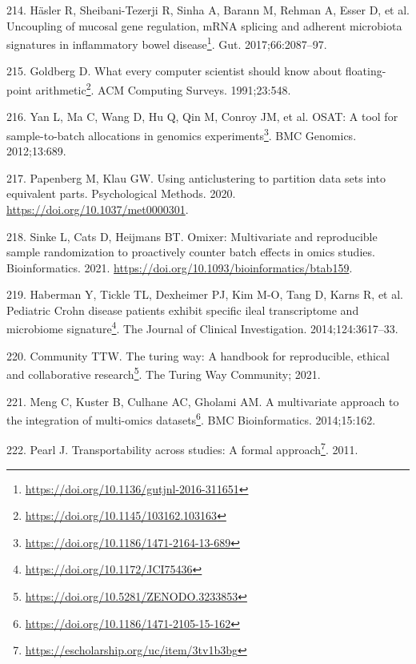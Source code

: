 \documentclass[
  12pt,
  a4paper,
  twoside,
  openright]{book}
\DeclareRobustCommand{\href}[2]{#2\footnote{\url{#1}}}
\newlength{\cslhangindent}
\newlength{\cslentryspacingunit} %
\newenvironment{CSLReferences}[2] %
 {%
  \setlength{\parindent}{0pt}
  \ifodd #1
  \let\oldpar\par
  \def\par{\hangindent=\cslhangindent\oldpar}
  \fi
  \setlength{\parskip}{#2\cslentryspacingunit}
 }%
 {}
\begin{document}
\begin{CSLReferences}{0}{0}
\leavevmode{}%
214. Häsler R, Sheibani-Tezerji R, Sinha A, Barann M, Rehman A, Esser D, et al. \href{https://doi.org/10.1136/gutjnl-2016-311651}{Uncoupling of mucosal gene regulation, mRNA splicing and adherent microbiota signatures in inflammatory bowel disease}. Gut. 2017;66:2087--97.

\leavevmode{}%
215. Goldberg D. \href{https://doi.org/10.1145/103162.103163}{What every computer scientist should know about floating-point arithmetic}. ACM Computing Surveys. 1991;23:548.

\leavevmode{}%
216. Yan L, Ma C, Wang D, Hu Q, Qin M, Conroy JM, et al. \href{https://doi.org/10.1186/1471-2164-13-689}{OSAT: A tool for sample-to-batch allocations in genomics experiments}. BMC Genomics. 2012;13:689.

\leavevmode{}%
217. Papenberg M, Klau GW. Using anticlustering to partition data sets into equivalent parts. Psychological Methods. 2020. \url{https://doi.org/10.1037/met0000301}.

\leavevmode{}%
218. Sinke L, Cats D, Heijmans BT. Omixer: Multivariate and reproducible sample randomization to proactively counter batch effects in omics studies. Bioinformatics. 2021. \url{https://doi.org/10.1093/bioinformatics/btab159}.

\leavevmode{}%
219. Haberman Y, Tickle TL, Dexheimer PJ, Kim M-O, Tang D, Karns R, et al. \href{https://doi.org/10.1172/JCI75436}{Pediatric Crohn disease patients exhibit specific ileal transcriptome and microbiome signature}. The Journal of Clinical Investigation. 2014;124:3617--33.

\leavevmode{}%
220. Community TTW. \href{https://doi.org/10.5281/ZENODO.3233853}{The turing way: A handbook for reproducible, ethical and collaborative research}. The Turing Way Community; 2021.

\leavevmode{}%
221. Meng C, Kuster B, Culhane AC, Gholami AM. \href{https://doi.org/10.1186/1471-2105-15-162}{A multivariate approach to the integration of multi-omics datasets}. BMC Bioinformatics. 2014;15:162.

\leavevmode{}%
222. Pearl J. \href{https://escholarship.org/uc/item/3tv1b3bg}{Transportability across studies: A formal approach}. 2011.


\end{CSLReferences}
\end{document}
